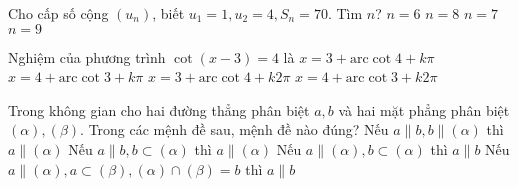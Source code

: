 \begin{ex} %
	Cho cấp số cộng $\left({u_n}\right)$, biết $u_1=1,u_2=4,S_n=70$. Tìm $n$?
	\choice
	{$n=6$}
	{$n=8$}
	{\True $n=7$}
	{$n=9$}
\end{ex}
\begin{ex} %
	Nghiệm của phương trình $\cot \left(x-3\right)=4$ là
	\choice
	{\True $x=3+\text{arc}\cot 4+k\pi $}
	{$x=4+\text{arc}\cot 3+k\pi$}
	{$x=3+\text{arc}\cot 4+k2\pi $}
	{$x=4+\text{arc}\cot 3+k2\pi $}
\end{ex}
\begin{ex} %
	Trong không gian cho hai đường thẳng phân biệt $a,b$ và hai mặt phẳng phân biệt $\left(\alpha \right),\left(\beta \right)$. Trong các mệnh đề sau, mệnh đề nào đúng?
	\choice
	{Nếu $a\parallel b,b\parallel \left(\alpha \right)$ thì $a \parallel \left(\alpha \right)$}
	{Nếu $a\parallel b,b\subset (\alpha)$ thì $a\parallel(\alpha)$}
	{Nếu $a\parallel \left(\alpha \right),b\subset (\alpha)$ thì $a\parallel b$}
	{\True Nếu $a\parallel (\alpha),a\subset \left(\beta \right),\left(\alpha \right)\cap \left(\beta \right)=b$ thì $a \parallel b$}
\end{ex}
